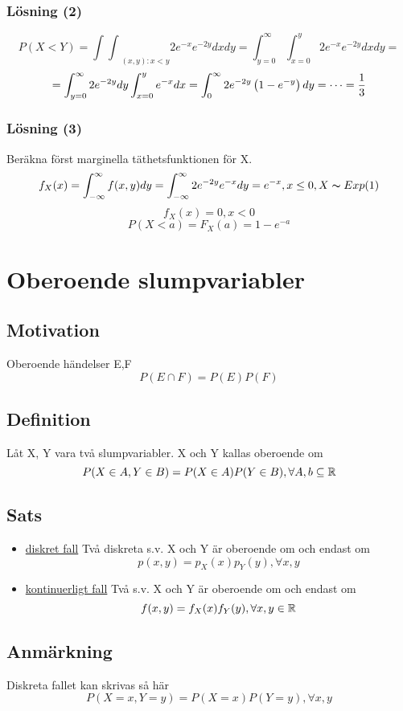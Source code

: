 \documentclass{article}
\begin{document}
\newcommand{\intyy}{\int^{\infty}_{y=0}}
\newcommand{\intxx}{\int^{y}_{x=0}}
\newcommand{\intzf}{\int^{\infty}_{0}}
\subsubsection{Lösning (2)}
$$ P(X<Y) = {\int\int}_{(x,y):x<y} 2e^{-x}e^{-2y} dxdy  = \intyy\intxx 2e^{-x}e^{-2y} dxdy =$$
$$ = \intyy 2e^{-2y}dy \intxx e^{-x} dx = \intzf 2e^{-2y}\pa{1-e^{-y}} dy = \cdots = \f 13$$

\newcommand{\intyf}{\int^{\infty}_{-\infty}}
\newcommand{\intyz}{\int^{\infty}_{-\infty}}
\subsubsection{Lösning (3)}
Beräkna först marginella täthetsfunktionen för X.
$$ f_X(x) = \intyf f(x,y)dy = \intyz 2e^{-2y}e^{-x}dy = e^{-x}, x\leq 0 , X\thicksim Exp(1)$$
$$ f_X(x) = 0 , x<0$$
$$ P(X<a) = F_X(a) = 1-e^{-a} $$

\section{Oberoende slumpvariabler}
\subsection{Motivation}

Oberoende händelser E,F
$$ P(E\cap F) = P(E)P(F) $$

\subsection{Definition}
Låt X, Y vara två slumpvariabler. X och Y kallas oberoende om
$$ P(X\in A, Y\in B) = P(X\in A)P(Y\in B), \forall A,b\subseteq {\mathbb R} $$

\subsection{Sats}
\begin{itemize}
  \item \underline{diskret fall} Två diskreta s.v. X och Y är oberoende om och endast om
    $$ p(x,y)=p_X(x)p_Y(y), \forall x,y $$
  \item \underline{kontinuerligt fall} Två s.v. X och Y är oberoende om och endast om
    $$ f(x,y)=f_X(x)f_Y(y), \forall x,y\in{\mathbb R} $$
\end{itemize}

\subsection{Anmärkning}
Diskreta fallet kan skrivas så här
$$ P(X=x, Y=y) = P(X=x)P(Y=y), \forall x,y$$
\end{document}
